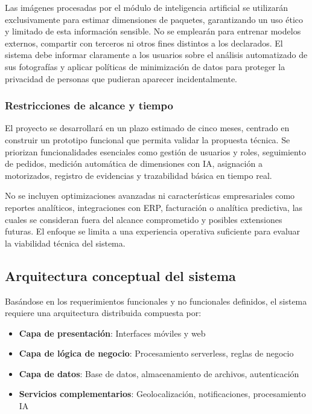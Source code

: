 Las imágenes procesadas por el módulo de inteligencia artificial se utilizarán exclusivamente para estimar dimensiones de paquetes, garantizando un uso ético y limitado de esta información sensible. No se emplearán para entrenar modelos externos, compartir con terceros ni otros fines distintos a los declarados. El sistema debe informar claramente a los usuarios sobre el análisis automatizado de sus fotografías y aplicar políticas de minimización de datos para proteger la privacidad de personas que pudieran aparecer incidentalmente.

\subsubsection{Restricciones de alcance y tiempo}

El proyecto se desarrollará en un plazo estimado de cinco meses, centrado en construir un prototipo funcional que permita validar la propuesta técnica. Se priorizan funcionalidades esenciales como gestión de usuarios y roles, seguimiento de pedidos, medición automática de dimensiones con IA, asignación a motorizados, registro de evidencias y trazabilidad básica en tiempo real.

No se incluyen optimizaciones avanzadas ni características empresariales como reportes analíticos, integraciones con ERP, facturación o analítica predictiva, las cuales se consideran fuera del alcance comprometido y posibles extensiones futuras. El enfoque se limita a una experiencia operativa suficiente para evaluar la viabilidad técnica del sistema.

\subsection{Arquitectura conceptual del sistema}

Basándose en los requerimientos funcionales y no funcionales definidos, el sistema requiere una arquitectura distribuida compuesta por:

\begin{itemize}
    \item \textbf{Capa de presentación}: Interfaces móviles y web
    \item \textbf{Capa de lógica de negocio}: Procesamiento serverless, reglas de negocio
    \item \textbf{Capa de datos}: Base de datos, almacenamiento de archivos, autenticación
    \item \textbf{Servicios complementarios}: Geolocalización, notificaciones, procesamiento IA
\end{itemize}

